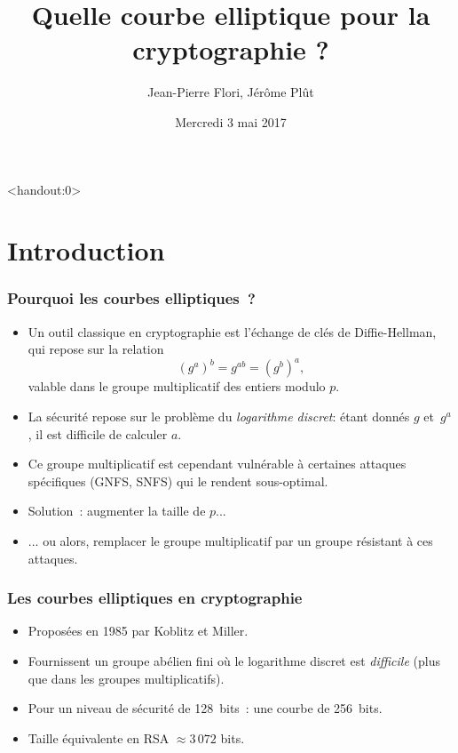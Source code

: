 \documentclass[francais]{beamer}
\begin{document}
\title[Quelle courbe elliptique ?]{Quelle courbe elliptique pour la cryptographie ?}
\author[J.-P. Flori]{Jean-Pierre Flori, Jérôme Plût}
\date[03/05/2017]{Mercredi 3 mai 2017}

\begin{frame}<handout:0> \titlepage
\end{frame}

\section{Introduction}

\begin{frame}\frametitle{Pourquoi les courbes elliptiques ?}
\begin{itemize}
\item Un outil classique en cryptographie est
l'échange de clés de Diffie-Hellman, qui repose sur la relation
\[ (g^a)^b = g^{ab} = (g^b)^a, \]
valable dans le groupe multiplicatif des entiers modulo $p$.
\item La sécurité repose sur le problème du \emph{logarithme discret}:
étant donnés $g$ et~$g^a$, il est difficile de calculer $a$.
\item Ce groupe multiplicatif est cependant vulnérable
à certaines attaques spécifiques (GNFS, SNFS)
qui le rendent sous-optimal.
\item Solution : augmenter la taille de $p$...
\item ... ou alors, remplacer le groupe multiplicatif
par un groupe résistant à ces attaques.
\end{itemize}
\end{frame}

\begin{frame}\frametitle{Les courbes elliptiques en cryptographie}
\begin{itemize}
\item Proposées en 1985 par Koblitz et Miller.
\item Fournissent un groupe abélien fini
où le logarithme discret est \emph{difficile}
(plus que dans les groupes multiplicatifs).
\end{itemize}
\begin{example}
\begin{itemize}
\item Pour un niveau de sécurité de 128~bits : une courbe de 256~bits.
\item Taille équivalente en RSA $≈ 3\,072$ bits.
\end{itemize}
\end{example}
\end{frame}
\end{document}
